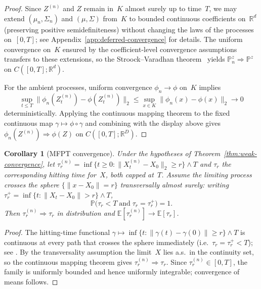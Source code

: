 \documentclass[11pt]{article}
\newcommand{\E}{\mathbb{E}}
\newcommand{\Prob}{\mathbb{P}}
\newcommand{\Rd}{\mathbb{R}^d}
\newcommand{\RD}{\mathbb{R}^D}
\newcommand{\norm}[1]{\lVert#1\rVert}
\newtheorem{cor}[thm]{Corollary}
\begin{document}
\begin{proof}
Since $Z^{(n)}$ and $Z$ remain in~$K$ almost surely up to time~$T$,
we may extend $(\mu_n,\Sigma_n)$ and $(\mu,\Sigma)$ from~$K$ to
bounded continuous coefficients on~$\Rd$
(preserving positive semidefiniteness)
without changing the laws of the processes on~$[0,T]$;
see Appendix~\ref{app:deferred-convergence} for details.
The uniform convergence on~$K$ ensured by
the coefficient-level convergence assumptions transfers to these
extensions, so the Stroock--Varadhan theorem~\cite{stroock1979multidimensional} yields
$\Prob_n^z\Rightarrow \Prob^z$ on $C([0,T];\Rd)$.

For the ambient processes, uniform convergence $\phi_n\to\phi$ on~$K$
implies
\[
  \sup_{t\le T}\norm{\phi_n(Z_t^{(n)})-\phi(Z_t^{(n)})}_2
  \le \sup_{x\in K}\norm{\phi_n(x)-\phi(x)}_2
  \longrightarrow 0
\]
deterministically.
Applying the continuous mapping theorem to the fixed continuous map
$\gamma\mapsto \phi\circ\gamma$ and combining with the display above
gives $\phi_n(Z^{(n)})\Rightarrow \phi(Z)$ on $C([0,T];\RD)$.
\end{proof}

\begin{cor}[MFPT convergence]\label{cor:mfpt-convergence}
  Under the hypotheses of Theorem~\ref{thm:weak-convergence},
  let $\tau_r^{(n)}=\inf\{t\ge 0:\norm{X_t^{(n)}-X_0}_2\ge r\}\wedge T$
  and $\tau_r$ the corresponding hitting time for~$X$,
  both capped at~$T$.
  Assume the limiting process crosses the sphere
  $\{\norm{x-X_0}=r\}$ transversally almost surely:
  writing
  $\tau_r^+=\inf\{t:\norm{X_t-X_0}>r\}\wedge T$,
  \[
    \Prob\bigl(\tau_r < T \;\text{and}\; \tau_r = \tau_r^+\bigr)=1.
  \]
  Then $\tau_r^{(n)}\Rightarrow\tau_r$ in distribution
  and $\E[\tau_r^{(n)}]\to\E[\tau_r]$.
\end{cor}

\begin{proof}
  The hitting-time functional
  $\gamma\mapsto\inf\{t:\norm{\gamma(t)-\gamma(0)}\ge r\}\wedge T$
  is continuous at every path that crosses the sphere
  immediately (i.e.\ $\tau_r=\tau_r^+<T$); see
  \cite[Thm.~13.6.1]{whitt2002stochastic}.
  By the transversality assumption the limit~$X$ lies a.s.\ in the
  continuity set, so the continuous mapping theorem gives
  $\tau_r^{(n)}\Rightarrow\tau_r$.
  Since $\tau_r^{(n)}\in[0,T]$, the family is uniformly bounded
  and hence uniformly integrable; convergence of means follows.
\end{proof}

\end{document}
